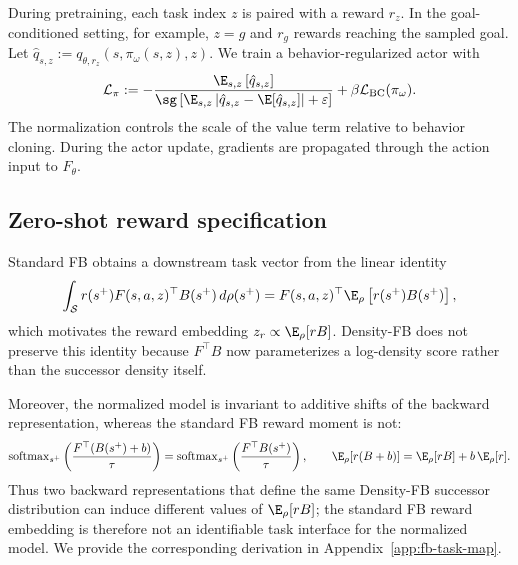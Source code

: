 During pretraining, each task index $z$ is paired with a reward $r_z$. 
In the goal-conditioned setting, for example, $z=g$ and $r_g$ rewards reaching the sampled goal. 
Let $\hat q_{s,z}:=q_{\theta,r_z}(s,\pi_\omega(s,z),z)$. We train a behavior-regularized actor with
\begin{equation}
    \mathcal L_{\pi} := -\frac{\E_{s,z}\left[\hat q_{s,z}\right]}{\sg\left[\E_{s,z}\left|\hat q_{s,z}-\E[\hat q_{s,z}]\right|+\varepsilon\right]}+\beta\mathcal L_{\mathrm{BC}}(\pi_\omega).
    \label{eq:actor-loss}
\end{equation}
The normalization controls the scale of the value term relative to behavior cloning. 
During the actor update, gradients are propagated through the action input to $F_\theta$.

\subsection{Zero-shot reward specification}
\label{sec:method-task-interface}

Standard FB obtains a downstream task vector from the linear identity
\begin{equation}
    \int_{\mathcal S} r(s^+)F(s,a,z)^\top B(s^+)\,d\rho(s^+) = F(s,a,z)^\top\E_\rho\left[r(s^+)B(s^+)\right],
    \label{eq:fb-linear-identity}
\end{equation}
which motivates the reward embedding $z_r\propto\E_\rho[rB]$. 
Density-FB does not preserve this identity because $F^\top B$ now parameterizes a log-density score rather than the successor density itself.

Moreover, the normalized model is invariant to additive shifts of the backward representation, whereas the standard FB reward moment is not:
\begin{equation}
    \operatorname{softmax}_{s^+}\left(\frac{F^\top(B(s^+)+b)}{\tau}\right)=\operatorname{softmax}_{s^+}\left(\frac{F^\top B(s^+)}{\tau}\right), \qquad \E_\rho[r(B+b)]=\E_\rho[rB]+b\,\E_\rho[r].
    \label{eq:task-gauge}
\end{equation}
Thus two backward representations that define the same Density-FB successor distribution can induce different values of $\E_\rho[rB]$; the standard FB reward embedding is therefore not an identifiable task interface for the normalized model. 
We provide the corresponding derivation in Appendix~\ref{app:fb-task-map}.

